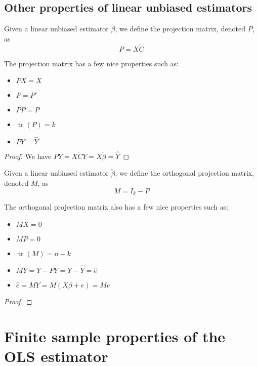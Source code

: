\subsection{Other properties of linear unbiased estimators}

\begin{definition}
Given a linear unbiased estimator $\tilde\beta$, we define the projection matrix, denoted $P$, as $$ P = X\tilde{C} $$
\end{definition}

\begin{proposition}
The projection matrix has a few nice properties such as:\begin{itemize}
\item $PX = X$
\item $P=P'$
\item $PP = P$
\item $\operatorname{tr}(P) = k$
\item $PY = \hat Y$
\end{itemize}
\end{proposition}
\begin{proof}
We have $PY = X\tilde{C}Y = X\tilde\beta = \hat Y$
\end{proof}

\begin{definition}
Given a linear unbiased estimator $\tilde\beta$, we define the orthogonal projection matrix, denoted $M$, as $$M = I_k - P$$
\end{definition}

\begin{proposition}
The orthogonal projection matrix also has a few nice properties such as:\begin{itemize}
\item $MX =0$
\item $MP = 0$
\item $\operatorname{tr}(M) = n-k$
\item $MY = Y - PY = Y - \hat Y = \hat e $
\item $\hat e = MY = M(X\beta + e) = Me$
\end{itemize}
\end{proposition}
\begin{proof}

\end{proof}

\section{Finite sample properties of the OLS estimator}

